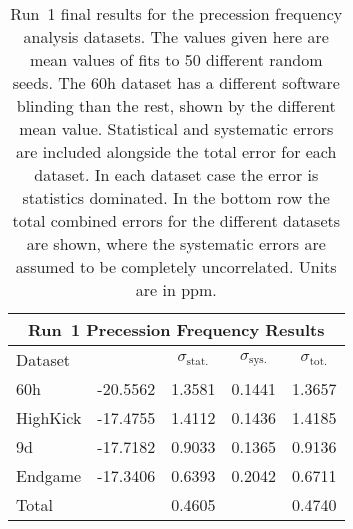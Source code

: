\begin{table}
\centering
\renewcommand{\arraystretch}{1.2}
\begin{tabular*}{\linewidth}{@{\extracolsep{\fill}}lcccc}
  \hline
    \multicolumn{5}{c}{\textbf{Run~1 Precession Frequency Results}} \\
  \hline\hline
    Dataset & \multicolumn{1}{c}{\R} & \multicolumn{1}{c}{$\sigma_{\text{stat.}}$} & \multicolumn{1}{c}{$\sigma_{\text{sys.}}$} & \multicolumn{1}{c}{$\sigma_{\text{tot.}}$} \\ 
  \hline
  	60h & -20.5562 & 1.3581 & 0.1441 & 1.3657 \\
  	HighKick & -17.4755 & 1.4112 & 0.1436 & 1.4185 \\
  	9d & -17.7182 & 0.9033 & 0.1365 & 0.9136 \\
  	Endgame & -17.3406 & 0.6393 & 0.2042 & 0.6711 \\
  \hline
  Total & & 0.4605 & & 0.4740 \\
  \hline
\end{tabular*}
\caption[Run~1 final results]{Run~1 final results for the precession frequency analysis datasets. The \R values given here are mean values of fits to 50 different random seeds. The 60h dataset has a different software blinding than the rest, shown by the different mean \R value. Statistical and systematic errors are included alongside the total error for each dataset. In each dataset case the error is statistics dominated. In the bottom row the total combined errors for the different datasets are shown, where the systematic errors are assumed to be completely uncorrelated. Units are in ppm.}
\label{tab:FinalResults}
\end{table}











